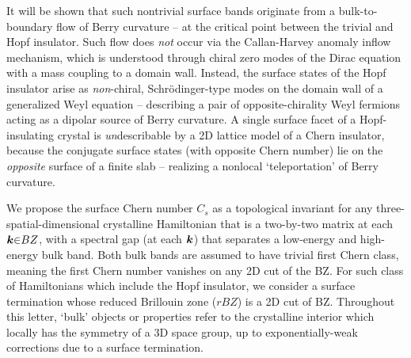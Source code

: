 \documentclass[aps,prl,showpacs,twocolumn,superscriptaddress]{revtex4-1}
\begin{document}
It will be shown that such nontrivial surface bands  originate from a bulk-to-boundary flow of Berry curvature --  at the critical point between the trivial and Hopf insulator. Such flow does \textit{not} occur via the Callan-Harvey anomaly inflow mechanism,\cite{callanharvey_anomalies,golterman_chiralfermions} which is understood through chiral zero modes of the Dirac equation with a mass coupling to a domain wall.\cite{jackiwrebbi_solitons,creutz_chiralsymmetry} Instead, the  surface states of the Hopf insulator arise as \textit{non}-chiral, Schr\"odinger-type  modes on the domain wall of a generalized Weyl equation -- describing a pair of opposite-chirality Weyl fermions acting as a dipolar source of Berry curvature. A single surface facet of a Hopf-insulating crystal is \textit{un}describable by a 2D lattice model of a Chern insulator, because the conjugate surface states (with opposite Chern number) lie on the \textit{opposite} surface of a finite slab --  realizing a nonlocal `teleportation' of Berry curvature.












We propose the surface Chern number $C_s$ as a topological invariant for any three-spatial-dimensional crystalline Hamiltonian that is a two-by-two matrix at each $\boldsymbol{k}{\in}BZ$, with a spectral gap (at each $\boldsymbol{k}$) that separates a low-energy and high-energy bulk band. Both bulk bands are assumed to have trivial first Chern class, meaning  the first Chern number vanishes on any 2D cut of the BZ.\cite{Panati_trivialityblochbundle}  For such class of Hamiltonians which include the Hopf insulator, we consider a surface termination whose reduced Brillouin zone ($rBZ$) is a 2D cut of BZ. Throughout this letter, `bulk' objects or properties refer to the crystalline interior which locally has the symmetry of a 3D space group, up to exponentially-weak corrections due to a surface termination. 
\end{document}
